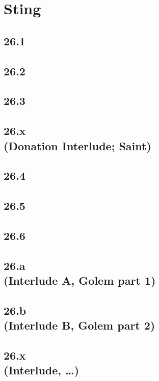\part{Sting}

 \chapter{26.1}

 \chapter{26.2}

 \chapter{26.3}

 \chapter[26.x (Donation Interlude; Saint)]{26.x\\(Donation Interlude; Saint)}

 \chapter{26.4}

 \chapter{26.5}

 \chapter{26.6}

 \chapter[26.a (Interlude A, Golem part 1)]{26.a\\(Interlude A, Golem part 1)}

 \chapter[26.b (Interlude B, Golem part 2)]{26.b\\(Interlude B, Golem part 2)}

 \chapter[26.x (Interlude, …)]{26.x\\(Interlude, …)}











